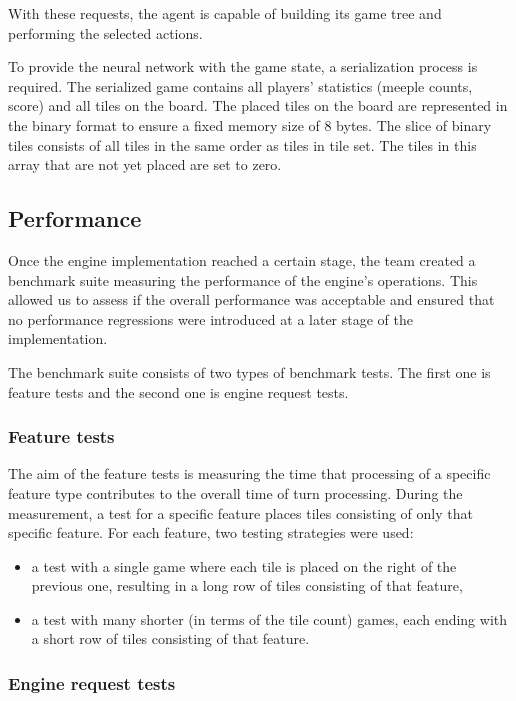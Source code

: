 With these requests, the agent is capable of building its game tree and performing the selected actions.

To provide the neural network with the game state, a serialization process is required. The serialized game contains all players' statistics (meeple counts, score) and all tiles on the board. The placed tiles on the board are represented in the binary format to ensure a fixed memory size of 8 bytes. The slice of binary tiles consists of all tiles in the same order as tiles in tile set. The tiles in this array that are not yet placed are set to zero.

\subsection{Performance}

Once the engine implementation reached a certain stage,
the team created a benchmark suite measuring the performance of the engine’s operations.
This allowed us to assess if the overall performance was acceptable and ensured that
no performance regressions were introduced at a later stage of the implementation.

The benchmark suite consists of two types of benchmark tests.
The first one is feature tests and the second one is engine request tests.


\subsubsection{Feature tests}

The aim of the feature tests is measuring the time that processing of
a specific feature type contributes to the overall time of turn processing.
During the measurement, a test for a specific feature places tiles consisting of
only that specific feature. For each feature, two testing strategies were used:
\begin{itemize}
	\item a test with a single game where each tile is placed on the right of the previous one,
          resulting in a long row of tiles consisting of that feature,
    \item a test with many shorter (in terms of the tile count) games,
          each ending with a short row of tiles consisting of that feature.
\end{itemize}

\subsubsection{Engine request tests}

